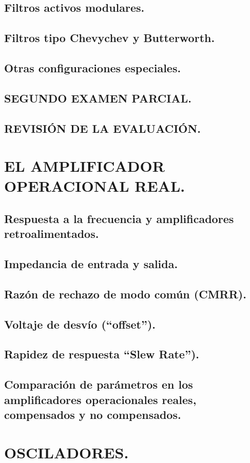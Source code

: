 \documentclass{myarticle}
\begin{document}
\subsection{Filtros activos modulares.}
\subsection{Filtros tipo Chevychev y Butterworth.}
\subsection{Otras configuraciones especiales.}
\subsection{\bf SEGUNDO EXAMEN PARCIAL.}
\subsection{{\bf REVISIÓN DE LA EVALUACIÓN.}}
\section{ EL AMPLIFICADOR OPERACIONAL REAL.}
\subsection{Respuesta a la frecuencia y amplificadores retroalimentados.}
\subsection{Impedancia de entrada y salida.}
\subsection{Razón de rechazo de modo común (CMRR).}
\subsection{Voltaje de desvío (``offset'').}
\subsection{Rapidez de respuesta ``Slew Rate'').}
\subsection{Comparación de parámetros en los amplificadores operacionales reales, compensados y no compensados.}
\section{ OSCILADORES.}
\end{document}

